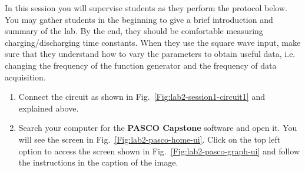 \documentclass[12pt]{report}
\begin{document}
\begin{tcolorbox}[title=Session \#1]
In this session you will supervise students as they perform the protocol below. You may gather students in the beginning to give a brief introduction and summary of the lab. 
By the end, they should be comfortable measuring charging/discharging time constants. 
When they use the square wave input, make sure that they understand how to vary the parameters to obtain useful data, i.e. changing the frequency of the function generator and the frequency of data acquisition.
\end{tcolorbox}

\begin{enumerate}
\item Connect the circuit as shown in Fig.~\ref{Fig:lab2-session1-circuit1} and explained above.
\item Search your computer for the \textbf{PASCO Capstone} software and open it. You will see the screen in Fig.~\ref{Fig:lab2-pasco-home-ui}. Click on the top left option to access the screen shown in Fig.~\ref{Fig:lab2-pasco-graph-ui} and follow the instructions in the caption of the image.


\end{enumerate}
\end{document}
